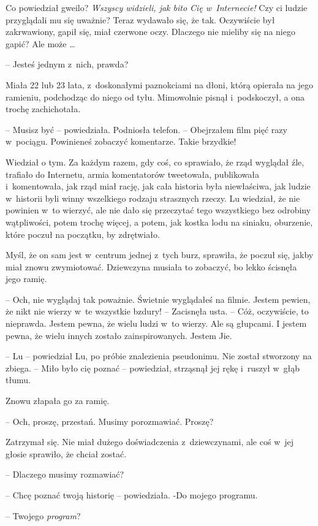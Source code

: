 \documentclass[oneside,polish,11pt,rmheadings]{mwbk}
\begin{document}
Co powiedział gweilo? \textit{Wszyscy widzieli, jak bito Cię w~Internecie! }Czy ci ludzie przyglądali mu się uważnie? Teraz wydawało się, że tak. Oczywiście był zakrwawiony, gapił się, miał czerwone oczy. Dlaczego nie mieliby się na niego gapić? Ale może  \ldots 

-- Jesteś jednym z~nich, prawda? 

Miała 22 lub 23 lata, z~doskonałymi paznokciami na dłoni, którą opierała na jego ramieniu, podchodząc do niego od tyłu. Mimowolnie pisnął i~podskoczył, a ona trochę zachichotała. 

-- Musisz być -- powiedziała. Podniosła telefon. -- Obejrzałem film pięć razy w~pociągu. Powinieneś zobaczyć komentarze. Takie brzydkie!

Wiedział o tym. Za każdym razem, gdy coś, co sprawiało, że rząd wyglądał źle, trafiało do Internetu, armia komentatorów tweetowała, publikowała i~komentowała, jak rząd miał rację, jak cała historia była niewłaściwa, jak ludzie w~historii byli winny wszelkiego rodzaju strasznych rzeczy. Lu wiedział, że nie powinien w~to wierzyć, ale nie dało się przeczytać tego wszystkiego bez odrobiny wątpliwości, potem trochę więcej, a potem, jak kostka lodu na siniaku, oburzenie, które poczuł na początku, by zdrętwiało.

Myśl, że on sam jest w~centrum jednej z~tych burz, sprawiła, że poczuł się, jakby miał znowu zwymiotować. Dziewczyna musiała to zobaczyć, bo lekko ścisnęła jego ramię. 

-- Och, nie wyglądaj tak poważnie. Świetnie wyglądałeś na filmie. Jestem pewien, że nikt nie wierzy w~te wszystkie bzdury! -- Zacisnęła usta. -- Cóż, oczywiście, to nieprawda. Jestem pewna, że wielu ludzi w~to wierzy. Ale są głupcami. I jestem pewna, że wielu innych zostało zainspirowanych. Jestem Jie.

-- Lu -- powiedział Lu, po próbie znalezienia pseudonimu. Nie został stworzony na zbiega. -- Miło było cię poznać -- powiedział, strząsnął jej rękę i~ruszył w~głąb tłumu.

Znowu złapała go za ramię. 

-- Och, proszę, przestań. Musimy porozmawiać. Proszę? 

Zatrzymał się. Nie miał dużego doświadczenia z~dziewczynami, ale coś w~jej głosie sprawiło, że chciał zostać. 

-- Dlaczego musimy rozmawiać? 

-- Chcę poznać twoją historię -- powiedziała. -Do mojego programu. 

-- Twojego \textit{program}?
\end{document}
